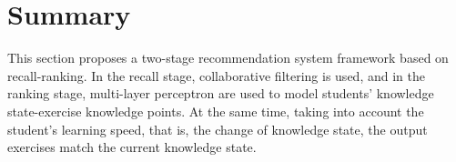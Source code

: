\section{Summary}
This section proposes a two-stage recommendation system framework based on recall-ranking. In the recall stage, collaborative filtering is used, and in the ranking stage, multi-layer perceptron are used to model students' knowledge state-exercise knowledge points. At the same time, taking into account the student's learning speed, that is, the change of knowledge state, the output exercises match the current knowledge state.
